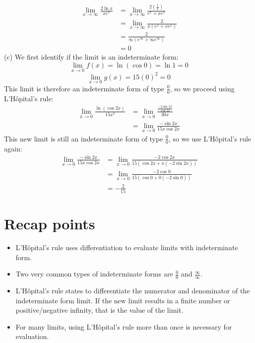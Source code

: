 \documentclass[11pt]{scrartcl}
\begin{document}
\begin{align*}
\lim_{x \to \infty} \frac{2 \ln x}{xe^x} &= \lim_{x \to \infty}\frac{2(\frac{1}{x})}{e^x+xe^x}\\
                                         &=      \lim_{x \to \infty}\frac{2}{x(e^x+xe^x)} \\
                                         &=      \frac{2}{\infty(e^\infty+\infty e^\infty)}\\
                                         &=0
\end{align*}
\noindent 
(c) We first identify if the limit is an indeterminate form: 
$$\lim_{x \to 0}{f(x)}=\ln(\cos 0)=\ln1=0$$
$$\lim_{x \to 0}g(x)=15(0)^2=0$$
\noindent 
This limit is therefore an indeterminate form of type $\frac{0}{0}$, so we proceed using L'Hôpital's rule:
\begin{align*}
\lim_{x \to 0} \frac{\ln(\cos 2x)}{15x^2} &=\lim_{x \to 0} \frac{\frac{-2 \sin 2x}{\cos 2x}}{30x} \\
&=\lim_{x \to 0} \frac{-\sin 2x}{15x \cos 2x}
\end{align*}
\noindent 
This new limit is still an indeterminate form of type $\frac{0}{0}$, so we use L'Hôpital's rule again: 
\begin{align*}
\lim_{x \to 0} \frac{-\sin 2x}{15x \cos 2x} &=\lim_{x \to 0} \frac{-2\cos 2x}{15(\cos 2x+x(-2\sin 2x))} \\
&=\lim_{x \to 0}\frac{-2 \cos 0}{15(\cos 0+0(-2 \sin 0))} \\
&=-\frac{2}{15}
\end{align*}
\section{Recap points}
\begin{itemize}
    \item L'Hôpital's rule uses differentiation to evaluate limits with indeterminate form. 
    \item Two very common types of indeterminate forms are $\frac{0}{0}$ and $\frac{\infty}{\infty}$. 
    \item L'Hôpital's rule states to differentiate the numerator and denominator of the indeterminate form limit. If the new limit results in a finite number or positive/negative infinity, that is the value of the limit. 
    \item For many limits, using L'Hôpital's rule more than once is necessary for evaluation. 
\end{itemize}
\end{document}
